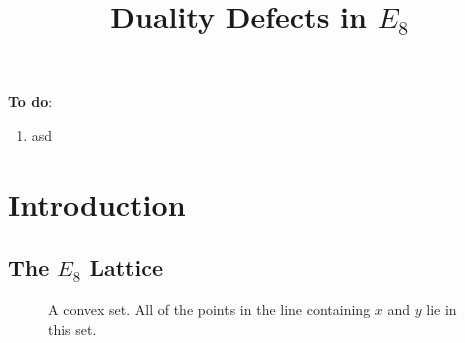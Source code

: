 \documentclass{article}
\title{Duality Defects in \texorpdfstring{$E_8$}{E8}}
\author{}
\date{}
\begin{document}
\maketitle
\tableofcontents

\vskip 1cm
\noindent \textbf{To do}:
\begin{enumerate}
    \item asd
\end{enumerate}

\newpage

\section{Introduction}

\subsection{The \texorpdfstring{$E_8$}{E8} Lattice}

\begin{figure}
    \centering
    \caption{A convex set. All of the points in the line containing $x$ and $y$ lie in this set.}
\end{figure}
\end{document}
